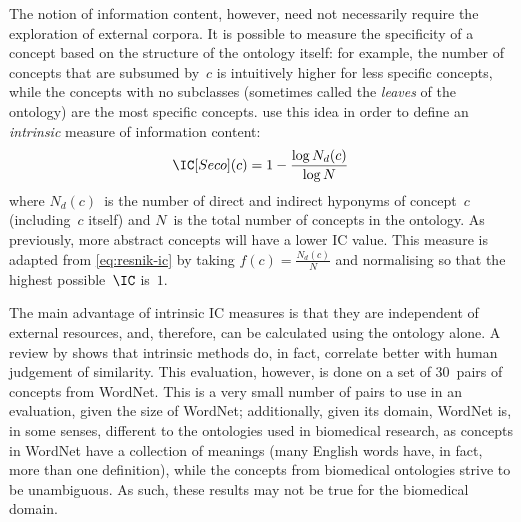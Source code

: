 The notion of information content, however, need not necessarily require the exploration of external corpora. It is possible to measure the specificity of a concept based on the structure of the ontology itself: for example, the number of concepts that are subsumed by~$c$ is intuitively higher for less specific concepts, while the concepts with no subclasses (sometimes called the \emph{leaves} of the ontology) are the most specific concepts. \citet{Seco2004} use this idea in order to define an \emph{intrinsic} measure of information content:
\begin{equation}
    \IC[Seco](c) = 1 - \frac{\log N_d(c)}{\log N}
    \label{eq:seco}
\end{equation}
where $N_d(c)$~is the number of direct and indirect hyponyms of concept~$c$ (including~$c$ itself) and $N$~is the total number of concepts in the ontology. As previously, more abstract concepts will have a lower IC value. This measure is adapted from \eqref{eq:resnik-ic} by taking $f(c)=\frac{N_d(c)}{N}$ and normalising so that the highest possible~$\IC$ is~$1$.

The main advantage of intrinsic IC measures is that they are independent of external resources, and, therefore, can be calculated using the ontology alone. A review by \citet{Sanchez2011e} shows that intrinsic methods do, in fact, correlate better with human judgement of similarity. This evaluation, however, is done on a set of $30$~pairs of concepts from WordNet. This is a very small number of pairs to use in an evaluation, given the size of WordNet; additionally, given its domain, WordNet is, in some senses, different to the ontologies used in biomedical research, as concepts in WordNet have a collection of meanings (many English words have, in fact, more than one definition), while the concepts from biomedical ontologies strive to be unambiguous. As such, these results may not be true for the biomedical domain.

